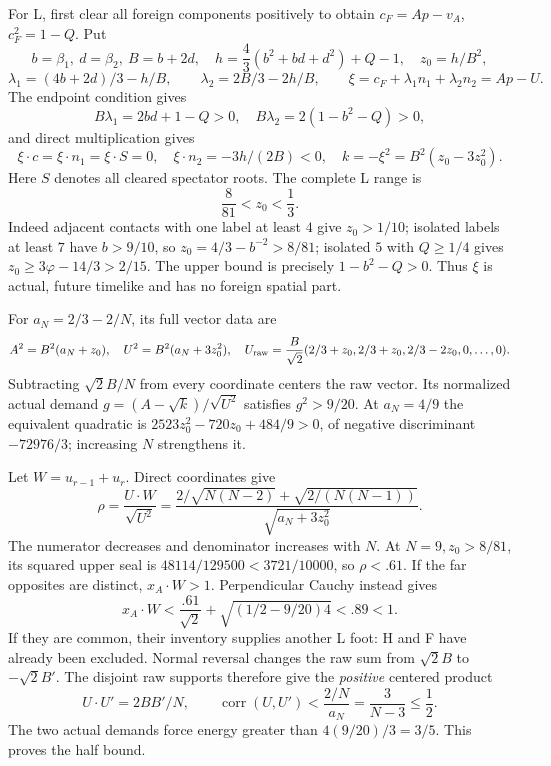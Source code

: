 \documentclass[11pt]{article}
\theoremstyle{remark}
\newcommand{\ph}{\varphi}
\begin{document}
For L, first clear all foreign components positively to obtain
\(c_F=A p-v_A\), \(c_F^2=1-Q\). Put
\[
 b=\beta_1,\ d=\beta_2,\ B=b+2d,\quad
 h=\frac43(b^2+bd+d^2)+Q-1,\quad z_0=h/B^2,
\]
\[
 \lambda_1=(4b+2d)/3-h/B,\qquad
 \lambda_2=2B/3-2h/B,\qquad
 \xi=c_F+\lambda_1n_1+\lambda_2n_2=A p-U .
\]
The endpoint condition gives
\[
 B\lambda_1=2bd+1-Q>0,\quad
 B\lambda_2=2(1-b^2-Q)>0,
\]
and direct multiplication gives
\[
 \xi\cdot c=\xi\cdot n_1=\xi\cdot S=0,\quad
 \xi\cdot n_2=-3h/(2B)<0,\quad
 k=-\xi^2=B^2(z_0-3z_0^2).
\]
Here \(S\) denotes all cleared spectator roots. The complete L
range is
\begin{equation}\label{eq:Ldomain}
 \frac8{81}<z_0<\frac13.
\end{equation}
Indeed adjacent contacts with one label at least \(4\) give
\(z_0>1/10\); isolated labels at least \(7\) have \(b>9/10\),
so \(z_0=4/3-b^{-2}>8/81\); isolated \(5\) with \(Q\ge1/4\)
gives \(z_0\ge3\ph-14/3>2/15\).
The upper bound is precisely \(1-b^2-Q>0\).
Thus \(\xi\) is actual, future timelike and has no foreign spatial part.

For \(a_N=2/3-2/N\), its full vector data are
\begin{equation}\label{eq:Lvector}
 A^2=B^2(a_N+z_0),\quad
 U^2=B^2(a_N+3z_0^2),\quad
 U_{\rm raw}=\frac B{\sqrt2}(2/3+z_0,2/3+z_0,2/3-2z_0,0,\ldots,0).
\end{equation}
Subtracting \(\sqrt2 B/N\) from every coordinate centers the raw
vector. Its normalized actual demand
\(g=(A-\sqrt k)/\sqrt{U^2}\) satisfies \(g^2>9/20\).
At \(a_N=4/9\) the equivalent quadratic is
\(2523z_0^2-720z_0+484/9>0\), of negative discriminant
\(-72976/3\); increasing \(N\) strengthens it.

Let \(W=u_{r-1}+u_r\). Direct coordinates give
\begin{equation}\label{eq:rho}
 \rho=\frac{U\cdot W}{\sqrt{U^2}}
 =\frac{2/\sqrt{N(N-2)}+\sqrt{2/(N(N-1))}}
        {\sqrt{a_N+3z_0^2}} .
\end{equation}
The numerator decreases and denominator increases with \(N\).
At \(N=9,z_0>8/81\), its squared upper seal is
\(48114/129500<3721/10000\), so \(\rho<.61\).
If the far opposites are distinct, \(x_A\cdot W>1\).
Perpendicular Cauchy instead gives
\[
 x_A\cdot W<\frac{.61}{\sqrt2}
              +\sqrt{(1/2-9/20)4}<.89<1.
\]
If they are common, their inventory supplies another L foot:
H and F have already been excluded. Normal reversal changes
the raw sum from \(\sqrt2 B\) to \(-\sqrt2 B'\).
The disjoint raw supports therefore give the \emph{positive}
centered product
\[
 U\cdot U'=2BB'/N,\qquad
 \operatorname{corr}(U,U')<\frac{2/N}{a_N}
                 =\frac3{N-3}\le\frac12.
\]
The two actual demands force energy greater than
\(4(9/20)/3=3/5\). This proves the half bound.
\end{document}
